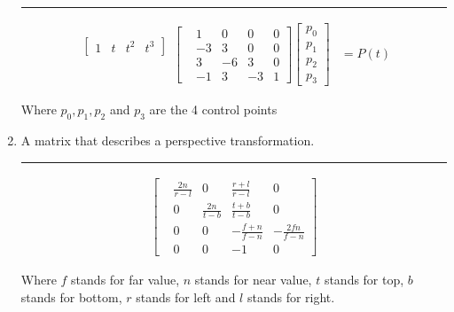 \documentclass[oneside]{article}
\newenvironment{answer}
  {\vspace*{0.2cm} \rule{12cm}{0.02cm} \vspace*{0.2cm}}
  {\vspace*{0.2cm}}
\begin{document}
\begin{enumerate}
	      \begin{answer}
	      	\begin{align*}
	      		\begin{matrix}
	      		\begin{bmatrix}
	      		1  & t  & t^2 & t^3
	      		\end{bmatrix} \\
	      		\mbox{} \\
	      		\mbox{} \\
	      		\mbox{}
	      		\end{matrix}
	      		\begin{bmatrix}
	      		  & 1  & 0  & 0  & 0 \\
	      		  & -3 & 3  & 0  & 0 \\
	      		  & 3  & -6 & 3  & 0 \\
	      		  & -1 & 3  & -3 & 1
	      		\end{bmatrix}
	      		\begin{bmatrix}
	      		p_0 \\
	      		p_1 \\
	      		p_2 \\
	      		p_3
	      		\end{bmatrix}
	      		& = P(t)
	      	\end{align*}

	      	Where $p_0, p_1, p_2$ and $p_3$ are the 4 control points
	      \end{answer}

	\item A matrix that describes a perspective transformation.

	      \begin{answer}
	      	\begin{align*}
	      		\begin{bmatrix}
	      		  & \frac{2n}{r-l} & 0              & \frac{r+l}{r-l}  & 0                \\
	      		  & 0              & \frac{2n}{t-b} & \frac{t+b}{t-b}  & 0                \\
	      		  & 0              & 0              & -\frac{f+n}{f-n} & -\frac{2fn}{f-n} \\
	      		  & 0              & 0              & -1               & 0
	      		\end{bmatrix}
	      	\end{align*}

	      	Where $f$ stands for far value, $n$ stands for near value, $t$ stands for top, $b$ stands for bottom, $r$ stands for left and $l$ stands for right.
	      \end{answer}


\end{enumerate}
\end{document}
